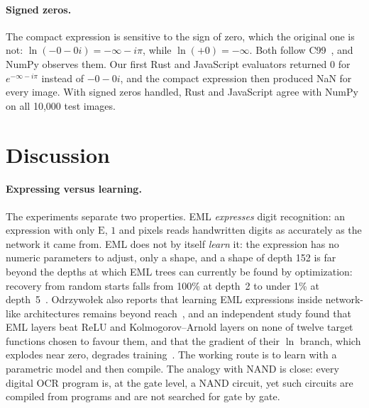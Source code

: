 \documentclass[11pt]{article}
\newcommand{\E}{\mathrm{E}}
\begin{document}
\paragraph{Signed zeros.}
The compact expression is sensitive to the sign of zero, which the original
one is not: $\ln(-0-0i)=-\infty-i\pi$, while $\ln(+0)=-\infty$. Both follow
C99~\cite{c99}, and NumPy observes them. Our first Rust and JavaScript
evaluators returned $0$ for $e^{-\infty-i\pi}$ instead of $-0-0i$, and the
compact expression then produced NaN for every image. With signed zeros
handled, Rust and JavaScript agree with NumPy on all 10{,}000 test images.

\section{Discussion}

\paragraph{Expressing versus learning.}
The experiments separate two properties. EML \emph{expresses} digit
recognition: an expression with only $\E$, $1$ and pixels reads handwritten
digits as accurately as the network it came from. EML does not by itself
\emph{learn} it: the expression has no numeric parameters to adjust, only a
shape, and a shape of depth 152 is far beyond the depths at which EML trees
can currently be found by optimization: recovery from random starts falls
from 100\% at depth~2 to under 1\% at depth~5~\cite{odrzywolek2026}.
Odrzywołek also reports that learning EML expressions inside network-like
architectures remains beyond reach~\cite{odrzywolek2026b}, and an independent
study found that EML layers beat ReLU and Kolmogorov--Arnold layers on none
of twelve target functions chosen to favour them, and that the gradient of
their $\ln$ branch, which explodes near zero, degrades
training~\cite{emlablation}. The working route is to learn with a
parametric model and then compile. The analogy with NAND is close: every
digital OCR program is, at the gate level, a NAND circuit, yet such circuits
are compiled from programs and are not searched for gate by gate.
\end{document}
